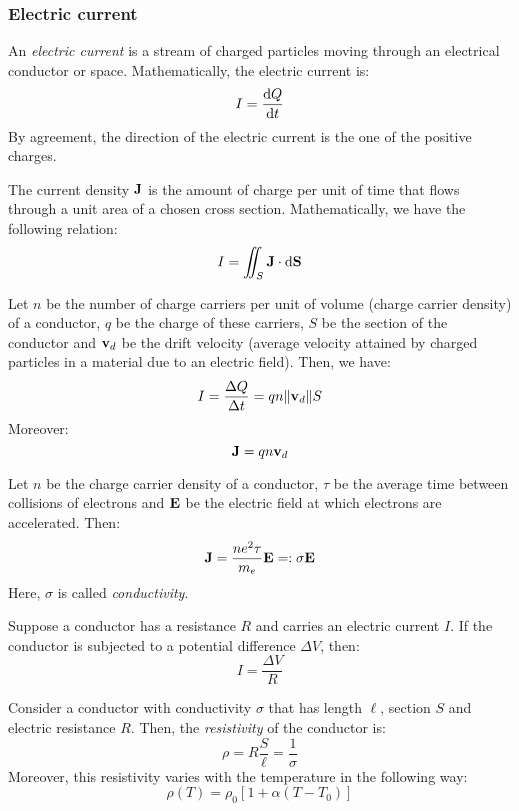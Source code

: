 \documentclass[../../../main.tex]{subfiles}
\begin{document}
\begin{multicols}{2}
  \subsubsection*{Electric current}
  \begin{definition}
    An \textit{electric current} is a stream of charged particles moving through an electrical conductor or space. Mathematically, the electric current is: $$I=\dv{Q}{t}$$
    By agreement, the direction of the electric current is the one of the positive charges.
  \end{definition}
  \begin{definition}
    The current density $\vb{J}$ is the amount of charge per unit of time that flows through a unit area of a chosen cross section. Mathematically, we have the following relation: $$I=\iint_S\vb{J}\cdot\dd \vb{S}$$
  \end{definition}
  \begin{prop}
    Let $n$ be the number of charge carriers per unit of volume (charge carrier density) of a conductor, $q$ be the charge of these carriers, $S$ be the section of the conductor and $\vb{v}_d$ be the drift velocity (average velocity attained by charged particles in a material due to an electric field). Then, we have:
    $$I=\frac{\Delta Q}{\Delta t}=q n \|\vb{v}_d\|S$$
    Moreover: $$\vb{J}=q n\vb{v}_d$$
  \end{prop}
  \begin{law}
    Let $n$ be the charge carrier density of a conductor, $\tau$ be the average time between collisions of electrons and $\vb{E}$ be the electric field at which electrons are accelerated. Then: $$\vb{J}=\frac{ne^2\tau}{m_e}\vb{E}=:\sigma\vb{E}$$
    Here, $\sigma$ is called \textit{conductivity}.
  \end{law}
  \begin{law}
    Suppose a conductor has a resistance $R$ and carries an electric current $I$. If the conductor is subjected to a potential difference $\Delta V$, then: $$I=\frac{\Delta V}{R}$$
  \end{law}
  \begin{definition}[Resistivity]
    Consider a conductor with conductivity $\sigma$ that has length $\ell$, section $S$ and electric resistance $R$. Then, the \textit{resistivity} of the conductor is: $$\rho=R\frac{S}{\ell}=\frac{1}{\sigma}$$
    Moreover, this resistivity varies with the temperature in the following way: $$\rho(T)=\rho_0\left[1+\alpha(T-T_0)\right]$$

\end{definition}
\end{multicols}
\end{document}
